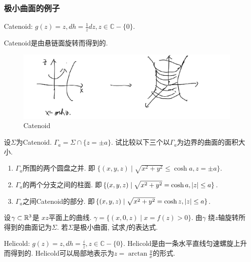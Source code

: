 \subsubsection{极小曲面的例子}
Catenoid: $g(z)=z, dh=\frac{1}{z}dz, z \in \mathbb{C}-\{0\}$.  
\par Catenoid是由悬链面旋转而得到的.

\begin{figure}[ht]
	\centering
	\includegraphics[scale=0.5]{images/catenoid.png}
	\caption{Catenoid}
	\label{variation_p}
\end{figure}


\begin{exercise}
    设$\Sigma$为Catenoid. $\Gamma_a=\Sigma \cap \{z=\pm a\}$. 试比较以下三个以$\Gamma_a$为边界的曲面的面积大小.
    \begin{enumerate}
        \item $\Gamma_a$所围的两个圆盘之并. 即 $\{(x,y,z)\mid \sqrt{x^2+y^2} \le \cosh a, z=\pm a\}$.
        \item $\Gamma_a$的两个分支之间的柱面. 即$\{(x,y,z)\mid \sqrt{x^2+y^2} = \cosh a, \left | z \right | \le a\}$.
        \item $\Gamma_a$之间Catenoid的部分. 即$\{(x,y,z)\mid  \sqrt{x^2+y^2}=\cosh z, \left | z \right | \le a \}$.
    \end{enumerate}
\end{exercise}
\begin{exercise}
    设$\gamma\subset \mathbb{R}^3$是 $xz$平面上的曲线. $\gamma= \{(x,0,z)\mid x=f(z) >0 \}$. 由$\gamma$ 绕$z$轴旋转所得到的曲面记为$\Sigma$. 若$\Sigma$是极小曲面, 试求$f$的表达式.
\end{exercise}
Helicold: $g(z)=z, dh= \frac{i}{z}, z \in \mathbb{C}-\{0\}$.
Helicold是由一条水平直线匀速螺旋上升而得到的. Helicold可以局部地表示为$z=\arctan\frac{y}{x}$的形式.

